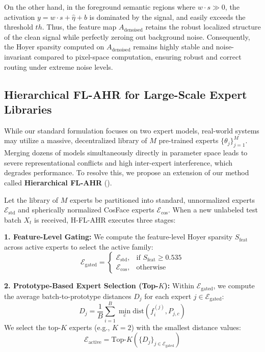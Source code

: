 \documentclass{article}
\theoremstyle{plain}
\theoremstyle{definition}
\theoremstyle{remark}
\begin{document}
On the other hand, in the foreground semantic regions where $w \cdot s \gg 0$, the activation $y = w \cdot s + \hat{\eta} + b$ is dominated by the signal, and easily exceeds the threshold $th$. Thus, the feature map $A_{\text{denoised}}$ retains the robust localized structure of the clean signal while perfectly zeroing out background noise. Consequently, the Hoyer sparsity computed on $A_{\text{denoised}}$ remains highly stable and noise-invariant compared to pixel-space computation, ensuring robust and correct routing under extreme noise levels.

\subsection{Hierarchical FL-AHR for Large-Scale Expert Libraries}

While our standard formulation focuses on two expert models, real-world systems may utilize a massive, decentralized library of $M$ pre-trained experts $\{ \theta_j \}_{j=1}^M$. Merging dozens of models simultaneously directly in parameter space leads to severe representational conflicts and high inter-expert interference, which degrades performance. To resolve this, we propose an extension of our method called \textbf{Hierarchical FL-AHR} ().

Let the library of $M$ experts be partitioned into standard, unnormalized experts $\mathcal{E}_{\text{std}}$ and spherically normalized CosFace experts $\mathcal{E}_{\text{cos}}$. When a new unlabeled test batch $X_t$ is received, H-FL-AHR executes three stages:

\textbf{1. Feature-Level Gating:} We compute the feature-level Hoyer sparsity $S_{\text{feat}}$ across active experts to select the active family:
\begin{equation}
    \mathcal{E}_{\text{gated}} = \begin{cases} \mathcal{E}_{\text{std}}, & \text{if } S_{\text{feat}} \ge 0.535 \\ \mathcal{E}_{\text{cos}}, & \text{otherwise} \end{cases}
\end{equation}

\textbf{2. Prototype-Based Expert Selection (Top-$K$):} Within $\mathcal{E}_{\text{gated}}$, we compute the average batch-to-prototype distances $D_j$ for each expert $j \in \mathcal{E}_{\text{gated}}$:
\begin{equation}
    D_j = \frac{1}{B} \sum_{i=1}^B \min_c \text{dist}\left( f^{(j)}_i, P_{j, c} \right)
\end{equation}
We select the top-$K$ experts (e.g., $K=2$) with the smallest distance values:
\begin{equation}
    \mathcal{E}_{\text{active}} = \text{Top-}K \left( \{D_j\}_{j \in \mathcal{E}_{\text{gated}}} \right)
\end{equation}
\end{document}
